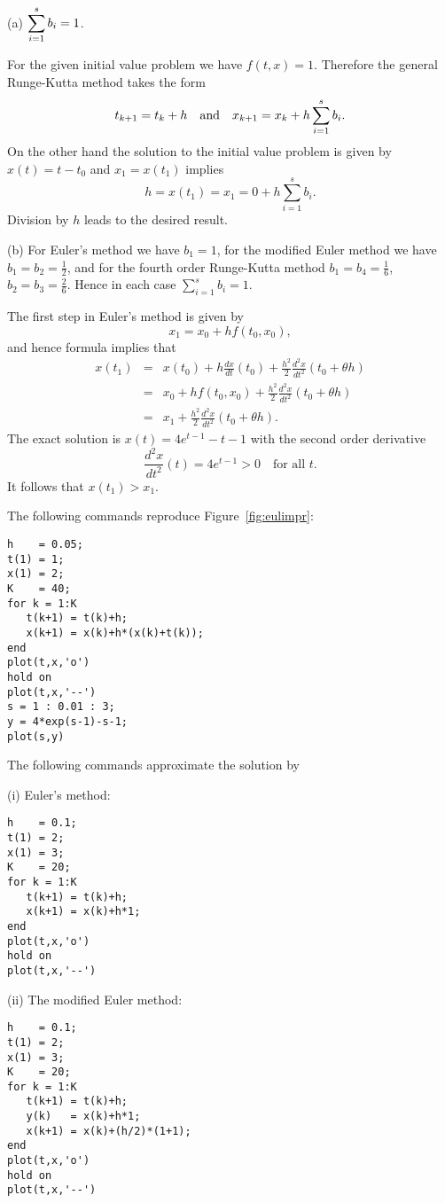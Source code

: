 (a) \ans $\displaystyle\sum_{i=1}^s b_i = 1$.

\soln For the given initial value problem we have $f(t,x)=1$.
Therefore the general Runge-Kutta method takes the form
\[
t_{k+1} = t_k + h\quad\mbox{and}\quad x_{k+1} = x_k + h\sum_{i=1}^s b_i.
\]
On the other hand the solution to the initial value problem is
given by $x(t) = t-t_0$ and $x_1=x(t_1)$ implies
\[
h = x(t_1) = x_1 = 0+h\sum_{i=1}^s b_i.
\]
Division by $h$ leads to the desired result.

(b) For Euler's method we have $b_1=1$, for the modified Euler
method we have $b_1=b_2=\frac{1}{2}$, and for the fourth order
Runge-Kutta method $b_1=b_4 = \frac{1}{6}$,
$b_2 = b_3 = \frac{2}{6}$.  Hence in each case $\sum_{i=1}^s b_i=1$.

 The first step in Euler's method is given by
\[
x_1 = x_0 + hf(t_0,x_0),
\]
and hence formula  implies that
\begin{eqnarray*}
x(t_1) &=&  x(t_0)+h\frac{dx}{dt}(t_0)+
\frac{h^2}{2}\frac{d^2x}{dt^2}(t_0+\theta h)\\
&=& x_0 + hf(t_0,x_0) +\frac{h^2}{2}\frac{d^2x}{dt^2}(t_0+\theta h)\\
&=& x_1 +\frac{h^2}{2}\frac{d^2x}{dt^2}(t_0+\theta h).
\end{eqnarray*}
The exact solution is $x(t)= 4e^{t-1}-t-1$ with the second order
derivative
\[
\frac{d^2x}{dt^2}(t) = 4e^{t-1}>0\quad \mbox{for all $t$.}
\]
It follows that $x(t_1) > x_1$.

 The following \Matlab commands reproduce
Figure~\ref{fig:eulimpr}:
\begin{verbatim}
h    = 0.05;
t(1) = 1;
x(1) = 2;
K    = 40;
for k = 1:K
   t(k+1) = t(k)+h;
   x(k+1) = x(k)+h*(x(k)+t(k));
end
plot(t,x,'o')
hold on
plot(t,x,'--')
s = 1 : 0.01 : 3;
y = 4*exp(s-1)-s-1;
plot(s,y)
\end{verbatim}

 The following \Matlab commands approximate the
solution by

(i) Euler's method:
\begin{verbatim}
h    = 0.1;
t(1) = 2;
x(1) = 3;
K    = 20;
for k = 1:K
   t(k+1) = t(k)+h;
   x(k+1) = x(k)+h*1;
end
plot(t,x,'o')
hold on
plot(t,x,'--')
\end{verbatim}

(ii) The modified Euler method:
\begin{verbatim}
h    = 0.1;
t(1) = 2;
x(1) = 3;
K    = 20;
for k = 1:K
   t(k+1) = t(k)+h;
   y(k)   = x(k)+h*1;
   x(k+1) = x(k)+(h/2)*(1+1);
end
plot(t,x,'o')
hold on
plot(t,x,'--')
\end{verbatim}


